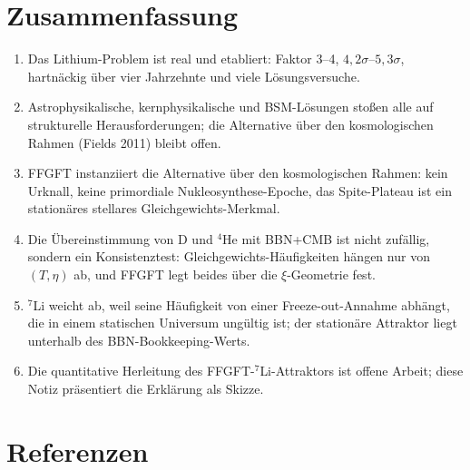 \documentclass[11pt,a4paper]{article}
\begin{document}
\section{Zusammenfassung}

\begin{enumerate}\itemsep2pt
\item Das Lithium-Problem ist real und etabliert: Faktor 3--4, $4{,}2\sigma$--$5{,}3\sigma$, hartnäckig über vier Jahrzehnte und viele Lösungsversuche.
\item Astrophysikalische, kernphysikalische und BSM-Lösungen stoßen alle auf strukturelle Herausforderungen; die Alternative über den kosmologischen Rahmen (Fields 2011) bleibt offen.
\item FFGFT instanziiert die Alternative über den kosmologischen Rahmen: kein Urknall, keine primordiale Nukleosynthese-Epoche, das Spite-Plateau ist ein stationäres stellares Gleichgewichts-Merkmal.
\item Die Übereinstimmung von D und $^4$He mit BBN+CMB ist nicht zufällig, sondern ein Konsistenztest: Gleichgewichts-Häufigkeiten hängen nur von $(T, \eta)$ ab, und FFGFT legt beides über die $\xi$-Geometrie fest.
\item $^7$Li weicht ab, weil seine Häufigkeit von einer Freeze-out-Annahme abhängt, die in einem statischen Universum ungültig ist; der stationäre Attraktor liegt unterhalb des BBN-Bookkeeping-Werts.
\item Die quantitative Herleitung des FFGFT-$^7$Li-Attraktors ist offene Arbeit; diese Notiz präsentiert die Erklärung als Skizze.
\end{enumerate}

\section*{Referenzen}
\end{document}
